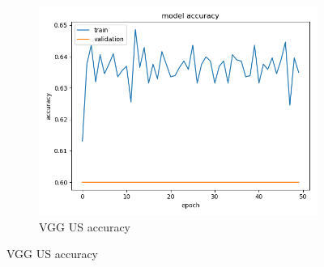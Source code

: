 \begin{figure}[h]
\begin{subfigure}[b]{.3\linewidth}
\includegraphics[width=\linewidth]{Figs/vgg_us_acc.jpg}
\caption{VGG US accuracy}
\end{subfigure}


\end{figure}
